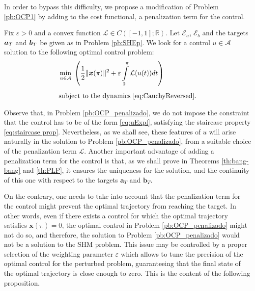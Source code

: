 \documentclass[twocolumn]{autart}    %
\begin{document}
In order to bypass this difficulty, we propose a modification of Problem \ref{pb:OCP1} by adding to the cost functional, a penalization term for the control. 

\bigskip

\begin{problem}\label{pb:OCP_penalizado}
Fix $\varepsilon>0$ and a convex function $\mathcal{L}\in C([-1,1];\mathbb{R})$.  Let $\mathcal{E}_a$, $\mathcal{E}_b$ and the targets $\bm{a}_T$ and $\bm{b}_T$ be given as in Problem \ref{pb:SHEp}.
We look for a control $u\in \mathcal A$ solution to the following optimal control problem:
\begin{align*}
	&\displaystyle\min_{u \in \mathcal A}\;\left(\dfrac{1}{2} \|\bm{x}(\pi)\|^2 + \varepsilon \displaystyle\int_0^\pi \mathcal{L}(u(t)) dt\right) 
	\\[5pt] 
	&\text{subject to the dynamics \eqref{eq:CauchyReversed}}.
\end{align*}
\end{problem}
\vspace{-1em}
Observe that, in Problem \ref{pb:OCP_penalizado}, we do not impose the constraint that the control has to be of the form \eqref{eq:uExpl}, satisfying the staircase property \eqref{eq:staircase prop}. Nevertheless, as we shall see, these features of $u$ will arise naturally in the solution to Problem \ref{pb:OCP_penalizado}, from a suitable choice of the penalization term $\mathcal{L}$.
Another important advantage of adding a penalization term for the control is that, as we shall prove in Theorems \ref{th:bang-bang} and \ref{th:PLP}, it ensures the uniqueness for the solution, and the continuity of this one with respect to the targets $\bm{a}_T$ and $\bm{b}_T$.

On the contrary, one needs to take into account that the penalization term for the control might prevent the optimal trajectory from reaching the target. In other words, even if there exists a control for which the optimal trajectory satisfies $\bm{x} (\pi) = 0$, the optimal control in Problem \ref{pb:OCP_penalizado} might not do so, and therefore, the solution to Problem \ref{pb:OCP_penalizado} would not be a solution to the SHM problem. This issue may be controlled by a proper selection of the weighting parameter $\varepsilon$ which allows to tune the precision of the optimal control for the perturbed problem, guaranteeing that the final state of the optimal trajectory is close enough to zero. This is the content of the following proposition.
\end{document}
